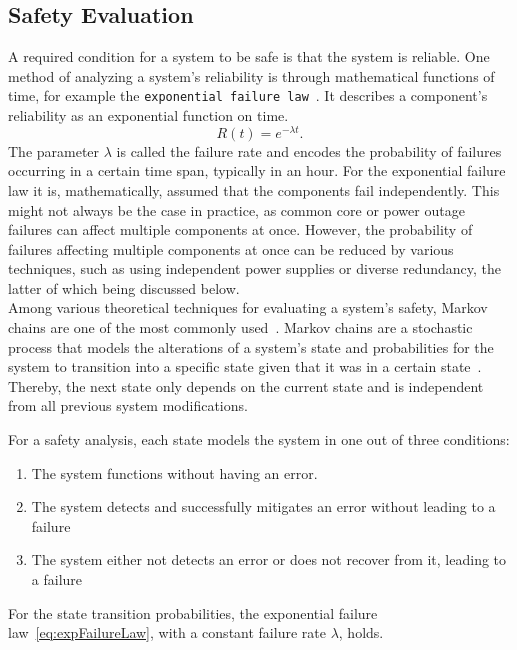\subsection{Safety Evaluation}
\label{sec:safetyEvaluation}
A required condition for a system to be safe is that the system is reliable.
One method of analyzing a system's reliability is through mathematical functions of time, for example the \texttt{exponential failure law}~\cite{GeffroyMotetDependableComputing}.
It describes a component's reliability as an exponential function on time.
\begin{equation}
R(t) = e^{-\lambda t}.
\label{eq:expFailureLaw}
\end{equation}
The parameter $\lambda$ is called the failure rate and encodes the probability of failures occurring in a certain time span, typically in an hour.
For the exponential failure law it is, mathematically, assumed that the components fail independently.
This might not always be the case in practice, as common core or power outage failures can affect multiple components at once.
However, the probability of failures affecting multiple components at once can be reduced by various techniques, such as using independent power supplies or diverse redundancy, the latter of which being discussed below.
\\

Among various theoretical techniques for evaluating a system's safety, Markov chains are one of the most commonly used~\cite{BarryFaultToleranceAnalysis}.
Markov chains are a stochastic process that models the alterations of a system's state and probabilities for the system to transition into a specific state given that it was in a certain state~\cite{KemenyMarkovChains}.
Thereby, the next state only depends on the current state and is independent from all previous system modifications.

For a safety analysis, each state models the system in one out of three conditions:
\begin{enumerate}
\item The system functions without having an error.
\item The system detects and successfully mitigates an error without leading to a failure
\item The system either not detects an error or does not recover from it, leading to a failure
\end{enumerate}

For the state transition probabilities, the exponential failure law~\autoref{eq:expFailureLaw}, with a constant failure rate $\lambda$, holds.

